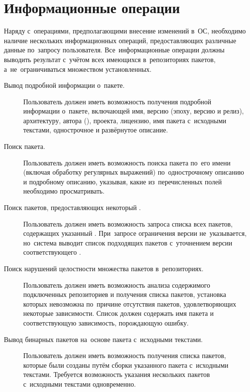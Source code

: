 \section{Информационные операции}

Наряду с~операциями, предполагающими внесение изменений в~ОС,
необходимо наличие нескольких информационных операций,
предоставляющих различные данные по~запросу пользователя.
Все~информационные операции должны выводить результат с~учётом всех имеющихся в~репозиториях пакетов,
а~не~ограничиваться множеством установленных.

\begin{description}

\item[Вывод подробной информации о~пакете.]
Пользователь должен иметь возможность получения подробной информации о~пакете,
включающей имя, версию (эпоху, версию и релиз), архитектуру, автора (),  проекта,
лицензию, имя пакета с~исходными текстами, однострочное и развёрнутое описание.

\item[Поиск пакета.]
Пользователь должен иметь возможность поиска пакета по~его имени (включая обработку регулярных выражений)
по~однострочному описанию и подробному описанию, указывая, какие из~перечисленных полей необходимо просматривать.

\item[Поиск пакетов, предоставляющих некоторый .]
Пользователь должен иметь возможность запроса списка всех пакетов,
содержащих указанный .
При~запросе ограничения версии не~указывается,
но~система выводит список подходящих пакетов с~уточнением версии соответствующего .

\item[Поиск нарушений целостности множества пакетов в~репозиториях.]
Пользователь должен иметь возможность анализа содержимого подключенных репозиториев и получения списка пакетов,
установка которых невозможна по~причине отсутствия пакетов, удовлетворяющих некоторые зависимости.
Список должен содержать имя пакета и соответствующую зависимость, порождающую ошибку.

\item[Вывод бинарных пакетов на~основе пакета с~исходными текстами.]
Пользователь должен иметь возможность получения списка пакетов,
которые были созданы путём сборки указанного пакета с~исходными текстами.
Требуется возможность указания нескольких пакетов с~исходными текстами одновременно.


\end{description}
